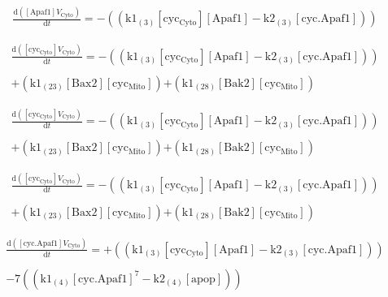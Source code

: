 \documentclass[a4paper,12pt]{article} %
\newcommand{\M}[1]{\mathrm{#1}}
\begin{document}
\begin{equation}
\begin{split}
\frac {\M{d}( {{\M{[Apaf1]}}    {V}_{\M{Cyto}} } ) }  {\M{d}{t} }  =  {  -  (( {{\M{k1}}_{\M{(3)}}    {\M{[cyc_{Cyto}]}}    {\M{[Apaf1]}}  -  {\M{k2}}_{\M{(3)}}    {\M{[cyc.Apaf1]}} } )) } 
\end{split}
\end{equation}


\begin{equation}
\begin{split}
\frac {\M{d}( {{\M{[cyc_{Cyto}]}}    {V}_{\M{Cyto}} } ) }  {\M{d}{t} }  =  {  -  (( {{\M{k1}}_{\M{(3)}}    {\M{[cyc_{Cyto}]}}    {\M{[Apaf1]}}  -  {\M{k2}}_{\M{(3)}}    {\M{[cyc.Apaf1]}} } )) } \\ 
  \\ 
   {  +  ( {{\M{k1}}_{\M{(23)}}    {\M{[Bax2]}}    {\M{[cyc_{Mito}]}} } ) } 
   {  +  ( {{\M{k1}}_{\M{(28)}}    {\M{[Bak2]}}    {\M{[cyc_{Mito}]}} } ) } 
\end{split}
\end{equation}

\begin{equation}
\begin{split}
\frac {\M{d}( {{\M{[cyc_{Cyto}]}}    {V}_{\M{Cyto}} } ) }  {\M{d}{t} }  =  {  -  (( {{\M{k1}}_{\M{(3)}}    {\M{[cyc_{Cyto}]}}    {\M{[Apaf1]}}  -  {\M{k2}}_{\M{(3)}}    {\M{[cyc.Apaf1]}} } )) } \\ 
  \\ 
   {  +  ( {{\M{k1}}_{\M{(23)}}    {\M{[Bax2]}}    {\M{[cyc_{Mito}]}} } ) }
   {  +  ( {{\M{k1}}_{\M{(28)}}    {\M{[Bak2]}}    {\M{[cyc_{Mito}]}} } ) } 
\end{split}
\end{equation}

\begin{equation}
\begin{split}
\frac {\M{d}( {{\M{[cyc_{Cyto}]}}    {V}_{\M{Cyto}} } ) }  {\M{d}{t} }  =  {  -  (( {{\M{k1}}_{\M{(3)}}    {\M{[cyc_{Cyto}]}}    {\M{[Apaf1]}}  -  {\M{k2}}_{\M{(3)}}    {\M{[cyc.Apaf1]}} } )) } \\ 
  \\ 
   {  +  ( {{\M{k1}}_{\M{(23)}}    {\M{[Bax2]}}    {\M{[cyc_{Mito}]}} } ) } 
   {  +  ( {{\M{k1}}_{\M{(28)}}    {\M{[Bak2]}}    {\M{[cyc_{Mito}]}} } ) } 
\end{split}
\end{equation}


\begin{equation}
\begin{split}
\frac {\M{d}( {{\M{[cyc.Apaf1]}}    {V}_{\M{Cyto}} } ) }  {\M{d}{t} }  =  {  +  (( {{\M{k1}}_{\M{(3)}}    {\M{[cyc_{Cyto}]}}    {\M{[Apaf1]}}  -  {\M{k2}}_{\M{(3)}}    {\M{[cyc.Apaf1]}} } )) } \\ 
  \\ 
   {  -  {7}    (( {{\M{k1}}_{\M{(4)}}    {\M{[cyc.Apaf1]}}^7  -  {\M{k2}}_{\M{(4)}}    {\M{[apop]}} } )) } \end{split}
\end{equation}
\end{document}
